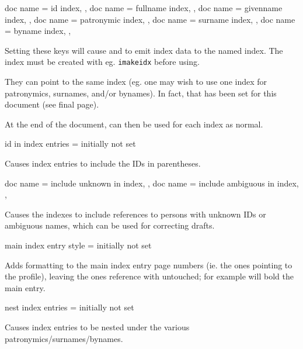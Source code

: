 \documentclass[
	a4paper,
]{article}
\begin{document}
\begin{docKeys}
	[
		doc parameter = {=\meta{...}},
		doc description = {initially not set},
	]
	{
		{
			doc name = id index,
		},
		{
			doc name = fullname index,
		},
		{
			doc name = givenname index,
		},
		{
			doc name = patronymic index,
		},
		{
			doc name = surname index,
		},
		{
			doc name = byname index,
		},
	}

	Setting these keys will cause  and  to emit index data to the named index. The index must be created with eg. \texttt{imakeidx} before using.

	They can point to the same index (eg. one may wish to use one index for patronymics, surnames, and/or bynames). In fact, that has been set for this document (see final page).

	At the end of the document,  can then be used for each index as normal.

\end{docKeys}

\begin{docKey}
	{id in index entries}
	{=}
	{initially not set}

	Causes index entries to include the IDs in parentheses.
\end{docKey}

\begin{docKeys}
	[
		doc parameter = {=\meta{true/false}},
		doc description = {initially not set},
	]
	{
		{
			doc name = include unknown in index,
		},
		{
			doc name = include ambiguous in index,
		},
	}

	Causes the indexes to include references to persons with unknown IDs or ambiguous names, which can be used for correcting drafts.

\end{docKeys}

\begin{docKey}
	{main index entry style}
	{=}
	{initially not set}

	Adds formatting to the main index entry page numbers (ie. the ones pointing to the profile), leaving the ones reference with  untouched; for example  will bold the main entry.
\end{docKey}

\begin{docKey}
	{nest index entries}
	{=}
	{initially not set}

	Causes index entries to be nested under the various patronymics/surnames/bynames.
\end{docKey}
\end{document}
